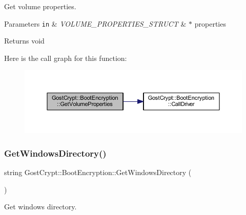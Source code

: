 Get volume properties. 


\begin{DoxyParams}[1]{Parameters}
\mbox{\tt in}  & {\em V\+O\+L\+U\+M\+E\+\_\+\+P\+R\+O\+P\+E\+R\+T\+I\+E\+S\+\_\+\+S\+T\+R\+U\+CT} & $\ast$ properties \\
\hline
\end{DoxyParams}
\begin{DoxyReturn}{Returns}
void 
\end{DoxyReturn}
Here is the call graph for this function\+:
\nopagebreak
\begin{figure}[H]
\begin{center}
\leavevmode
\includegraphics[width=350pt]{class_gost_crypt_1_1_boot_encryption_a8113cd3021864fa8bbd421c33925f83d_cgraph}
\end{center}
\end{figure}
\mbox{\label{class_gost_crypt_1_1_boot_encryption_a2faa08fabf7bd37b8ebd9e0b6b437274}} 
\subsubsection{\texorpdfstring{Get\+Windows\+Directory()}{GetWindowsDirectory()}}
{\footnotesize\ttfamily string Gost\+Crypt\+::\+Boot\+Encryption\+::\+Get\+Windows\+Directory (\begin{DoxyParamCaption}{ }\end{DoxyParamCaption})\hspace{0.3cm}{\ttfamily [protected]}}



Get windows directory. 

